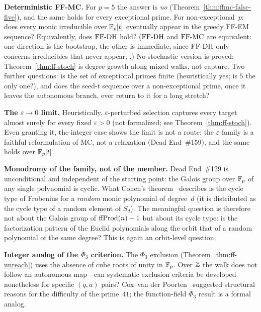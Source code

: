 \begin{frontierbox}
\textbf{Deterministic FF-MC.}
For $p = 5$ the answer is \emph{no} (Theorem~\ref{thm:ffmc-false-five}),
and the same holds for every exceptional prime.  For non-exceptional~$p$:
does every monic irreducible over $\mathbb{F}_p[t]$ eventually appear in the greedy
FF-EM sequence?  Equivalently, does $\mathrm{FF\text{-}DH}$ hold?  ($\mathrm{FF\text{-}DH}$ and $\mathrm{FF\text{-}MC}$ are equivalent:
one direction is the bootstrap, the other is immediate, since $\mathrm{FF\text{-}DH}$
only concerns irreducibles that never appear;
.)  No
stochastic version is proved: Theorem~\ref{thm:ff-stoch} is degree growth
along mixed walks, not capture.  Two further questions: is the set of
exceptional primes finite (heuristically yes; is $5$ the only one?), and
does the seed-$t$ sequence over a non-exceptional prime, once it leaves
the autonomous branch, ever return to it for a long stretch?
\end{frontierbox}

\begin{frontierbox}
\textbf{The $\varepsilon \to 0$ limit.}
Heuristically, $\varepsilon$-perturbed selection captures every target
almost surely for every fixed $\varepsilon > 0$ (not formalized; see
Theorem~\ref{thm:ff-stoch}).  Even granting it, the integer case shows
the limit is not a route: the $\varepsilon$-family is a faithful
reformulation of MC, not a relaxation (Dead End~\#159), and the same
holds over $\mathbb{F}_p[t]$.
\end{frontierbox}

\begin{frontierbox}
\textbf{Monodromy of the family, not of the member.}
Dead End~\#129 is unconditional and independent of the starting point:
the Galois group over $\mathbb{F}_p$ of any single polynomial is cyclic.  What
Cohen's theorem~\cite{Cohen1981} describes is the cycle type of
Frobenius for a \emph{random} monic polynomial of degree~$d$ (it is
distributed as the cycle type of a random element of $S_d$).  The
meaningful question is therefore not about the Galois group of
$\mathrm{ffProd}(n)+1$ but about its cycle type: is the factorization pattern of
the Euclid polynomials along the orbit that of a random polynomial of
the same degree?  This is again an orbit-level question.
\end{frontierbox}

\begin{frontierbox}
\textbf{Integer analog of the $\Phi_3$ criterion.}
The $\Phi_3$ exclusion (Theorem~\ref{thm:ff-unreach}) uses the absence
of cube roots of unity in $\mathbb{F}_p$.  Over $\mathbb{Z}$ the walk does not follow
an autonomous map---can systematic exclusion criteria be developed
nonetheless for specific $(q,a)$ pairs?  Cox--van der
Poorten~\cite{CoxVdP1968} suggested structural reasons for the
difficulty of the prime~$41$; the function-field $\Phi_3$ result is a
formal analog.
\end{frontierbox}

